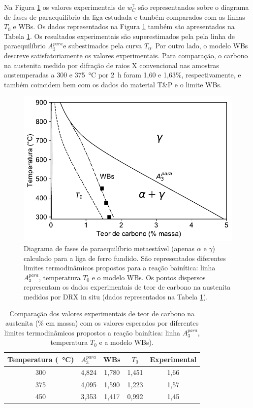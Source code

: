 Na Figura \ref{fig:WBs_para} os valores experimentais de $w_C^\gamma$ são representandos sobre o diagrama de fases de paraequilíbrio da liga estudada e também comparados com as linhas $T_0$ e WBs. Os dados representados na Figura \ref{fig:WBs_para} também são apresentados na Tabela \ref{tab:WBs_para}. Os resultados experimentais são superestimados pela pela linha de paraequilíbrio $A_3^{para}$e subestimados pela curva $T_0$. Por outro lado, o modelo WBs descreve satisfatoriamente os valores experimentais. Para comparação, o carbono na austenita medido por difração de raios X convencional nas amostras austemperadas a 300 e \SI{375}{\degreeCelsius} por 2~h foram 1,60 e 1,63\%, respectivamente, e também coincidem bem com os dados do material T\&P e o limite WBs.


\begin{figure}
  \centering  
  \includegraphics[width=.8\textwidth]{img/thermo-calc/WBs_para.pdf}
  \caption{Diagrama de fases de paraequilíbrio metaestável (apenas $\alpha$ e $\gamma$) calculado para a liga de ferro fundido. São representados diferentes limites termodinâmicos propostos para a reação bainítica: linha $A_3^{para}$, temperatura $T_0$ e o modelo WBs. Os pontos dispersos representam os dados experimentais de teor de carbono na austenita medidos por DRX in situ (dados representados na Tabela \ref{tab:WBs_para}).}
  \label{fig:WBs_para}
\end{figure}

\begin{table}
  \centering
  \caption{Comparação dos valores experimentais de teor de carbono na austenita (\% em massa) com os valores esperados por diferentes limites termodinâmicos propostos a reação bainítica: linha $A_3^{para}$, temperatura $T_0$ e a modelo WBs).}
  \begin{tabular}{ccccc}
    \hline
      Temperatura (\SI{}{\degreeCelsius}) & $A_3^{para}$ & WBs & $T_0$ & Experimental \\
    \hline
      300 & 4,824 & 1,780 & 1,451 & 1,66 \\
      375 & 4,095 & 1,590 & 1,223 & 1,57 \\
      450 & 3,353 & 1,417 & 0,992 & 1,45 \\
    \hline
  \end{tabular}
  \label{tab:WBs_para}
\end{table}